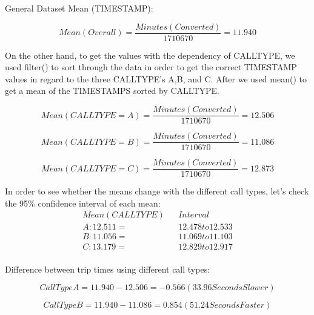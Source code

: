 \documentclass[11pt]{article}
\begin{document}
\par
General Dataset Mean (TIMESTAMP):

\begin{equation}
Mean (Overall) = \frac{Minutes (Converted)}{1710670} = 11.940
\end{equation}

\par
On the other hand, to get the values with the dependency of CALLTYPE, we used filter() to sort through the data in order to get the correct TIMESTAMP values in regard to the three CALLTYPE’s A,B, and C. After we used mean() to get a mean of the TIMESTAMPS sorted by CALLTYPE. 

\begin{equation}
Mean (CALLTYPE = A) = \frac{Minutes (Converted)}{1710670} = 12.506
\end{equation}

\begin{equation}
Mean (CALLTYPE = B) = \frac{Minutes (Converted)}{1710670} = 11.086
\end{equation}

\begin{equation}
Mean (CALLTYPE = C) = \frac{Minutes (Converted)}{1710670} = 12.873
\end{equation}

\par
In order to see whether the means change with the different call types, let's check the 95\% confidence interval of each mean:
\begin{equation*}
	\begin{aligned}
		Mean (CALL TYPE) &&Interval\\
A: 12.511 =&& 12.478 to 12.533\\
B: 11.056 =&& 11.069 to 11.103\\
C: 13.179 =&& 12.829 to 12.917\\
	\end{aligned}
\end{equation*}

\par
Difference between trip times using different call types:

\begin{equation}
Call Type A = 11.940 - 12.506 = -0.566 (33.96 Seconds Slower)
\end{equation}

\begin{equation}
Call Type B = 11.940 - 11.086 = 0.854(51.24 Seconds Faster)
\end{equation}
\end{document}
